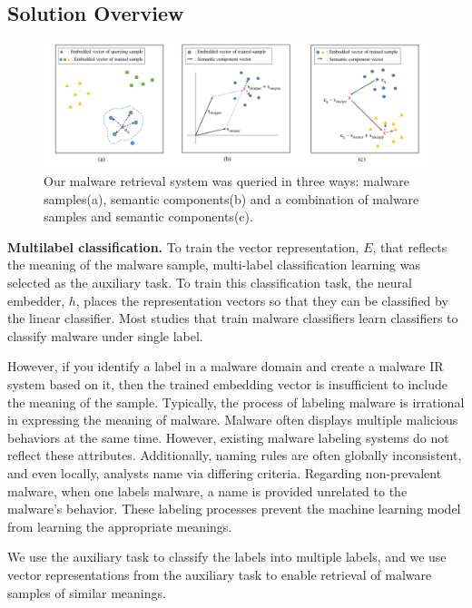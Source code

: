 \subsection{Solution Overview}
\begin{figure}[!htb] %
  \includegraphics[width=\textwidth]{../../figures/qualitative_all_fix2.pdf}
  \caption{Our malware retrieval system was queried in three ways: malware samples(a), semantic components(b) and a combination of malware samples and semantic components(c).}
  \label{fig:qualitative_all}
\end{figure}

\textbf{Multilabel classification. }
To train the vector representation, $E$, that reflects the meaning of the malware sample, multi-label classification learning was selected as the auxiliary task. To train this classification task, the neural embedder, $h$, places the representation vectors so that they can be classified by the linear classifier. Most studies that train malware classifiers learn classifiers to classify malware under single label.

However, if you identify a label in a malware domain and create a malware IR system based on it, then the trained embedding vector is insufficient to include the meaning of the sample. Typically, the process of labeling malware is irrational in expressing the meaning of malware. Malware often displays multiple malicious behaviors at the same time. However, existing malware labeling systems do not reflect these attributes. Additionally, naming rules are often globally inconsistent, and even locally, analysts name via differing criteria. Regarding non-prevalent malware, when one labels malware, a name is provided unrelated to the malware’s behavior. These labeling processes prevent the machine learning model from learning the appropriate meanings. 

We use the auxiliary task to classify the labels into multiple labels, and we use vector representations from the auxiliary task to enable retrieval of malware samples of similar meanings.



